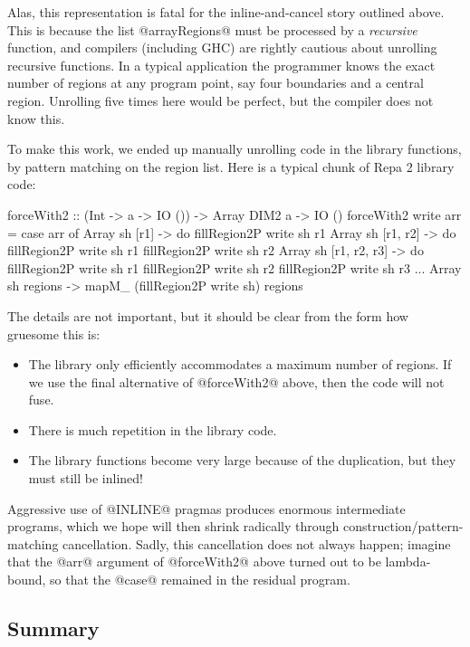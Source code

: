 Alas, this representation is fatal for the inline-and-cancel story outlined above. This is because the list @arrayRegions@ must be processed by a \emph{recursive} function, and compilers (including GHC) are rightly cautious about unrolling recursive functions. In a typical application the programmer knows the exact number of regions at any program point, say four boundaries and a central region. Unrolling five times here would be perfect, but the compiler does not know this.

\eject
To make this work, we ended up manually unrolling code in the library functions, by pattern matching on the region list. Here is a typical chunk of Repa 2 library code:
\par
\begin{small}
\begin{code}
  forceWith2 :: (Int -> a -> IO ())
             -> Array DIM2 a -> IO ()
  forceWith2 write arr
   = case arr of
      Array sh [r1]
       -> do fillRegion2P write sh r1
      Array sh [r1, r2]
       -> do fillRegion2P write sh r1
             fillRegion2P write sh r2
      Array sh [r1, r2, r3]
       -> do fillRegion2P write sh r1
             fillRegion2P write sh r2
             fillRegion2P write sh r3
      ...
      Array sh regions
       ->    mapM_ (fillRegion2P write sh) regions
\end{code}
\end{small}       
%
The details are not important, but it should be clear from the form how gruesome this is:
\begin{itemize}
\item The library only efficiently accommodates a maximum number of regions. If we use the final alternative of @forceWith2@ above, then the code will not fuse.
\item There is much repetition in the library code.
\item The library functions become very large because of the duplication, but they must still be inlined!
\end{itemize}
%
Aggressive use of @INLINE@ pragmas produces enormous intermediate programs, which we hope will then shrink radically through construction/pattern-matching cancellation. Sadly, this cancellation does not always happen; imagine that the @arr@ argument of @forceWith2@ above turned out to be lambda-bound, so that the @case@ remained in the residual program.


\subsection{Summary}

